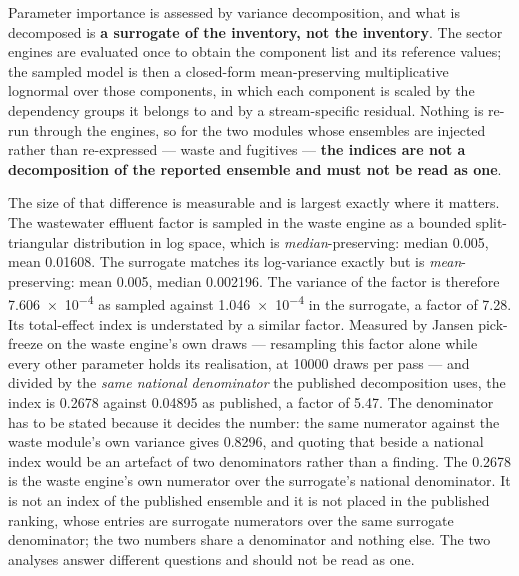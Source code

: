 \documentclass[essd]{copernicus}
\begin{document}
Parameter importance is assessed by variance decomposition, and what is decomposed is \textbf{a surrogate of the inventory, not the inventory}. The sector engines are evaluated once to obtain the component list and its reference values; the sampled model is then a closed-form mean-preserving multiplicative lognormal over those components, in which each component is scaled by the dependency groups it belongs to and by a stream-specific residual. Nothing is re-run through the engines, so for the two modules whose ensembles are injected rather than re-expressed --- waste and fugitives --- \textbf{the indices are not a decomposition of the reported ensemble and must not be read as one}.

The size of that difference is measurable and is largest exactly where it matters. The wastewater effluent factor is sampled in the waste engine as a bounded split-triangular distribution in log space, which is \emph{median}-preserving: median \num{0.005}, mean \num{0.01608}. The surrogate matches its log-variance exactly but is \emph{mean}-preserving: mean \num{0.005}, median \num{0.002196}. The variance of the factor is therefore \num{7.606e-4} as sampled against \num{1.046e-4} in the surrogate, a factor of \num{7.28}. Its total-effect index is understated by a similar factor. Measured by Jansen pick-freeze on the waste engine's own draws --- resampling this factor alone while every other parameter holds its realisation, at \num{10000} draws per pass --- and divided by the \emph{same national denominator} the published decomposition uses, the index is \num{0.2678} against \num{0.04895} as published, a factor of \num{5.47}. The denominator has to be stated because it decides the number: the same numerator against the waste module's own variance gives \num{0.8296}, and quoting that beside a national index would be an artefact of two denominators rather than a finding. The \num{0.2678} is the waste engine's own numerator over the surrogate's national denominator. It is not an index of the published ensemble and it is not placed in the published ranking, whose entries are surrogate numerators over the same surrogate denominator; the two numbers share a denominator and nothing else. The two analyses answer different questions and should not be read as one.
\end{document}
